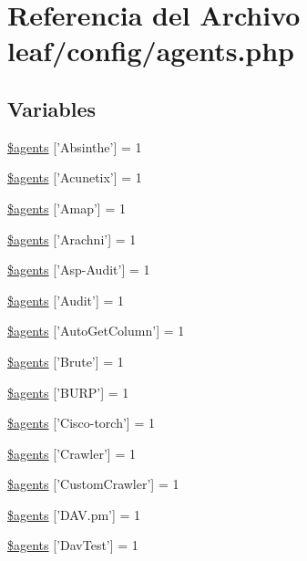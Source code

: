 \hypertarget{agents_8php}{\section{Referencia del Archivo leaf/config/agents.php}
\label{agents_8php}
}
\subsection*{Variables}
\begin{DoxyCompactItemize}
\item 
\hyperlink{agents_8php_a26354307c4e8f742e9a1835503de3a49}{\$agents} \mbox{[}'Absinthe'\mbox{]} = 1
\item 
\hyperlink{agents_8php_abbdedf5e446a9a99c06c8b32e8caf46e}{\$agents} \mbox{[}'Acunetix'\mbox{]} = 1
\item 
\hyperlink{agents_8php_a7e39730f201c353bf8ce0dff5b3088c1}{\$agents} \mbox{[}'Amap'\mbox{]} = 1
\item 
\hyperlink{agents_8php_a95d2a72c0b69091b2720de811d435830}{\$agents} \mbox{[}'Arachni'\mbox{]} = 1
\item 
\hyperlink{agents_8php_ae96e0481dc7a1032823b270a66e50721}{\$agents} \mbox{[}'Asp-\/Audit'\mbox{]} = 1
\item 
\hyperlink{agents_8php_a9edcf392a68dec4bf0cdc496cc3d6de9}{\$agents} \mbox{[}'Audit'\mbox{]} = 1
\item 
\hyperlink{agents_8php_ade22bffe2d979ef9c8070dcfd0595523}{\$agents} \mbox{[}'Auto\-Get\-Column'\mbox{]} = 1
\item 
\hyperlink{agents_8php_ae2900c7672753a2b91ea0ebe928f34d8}{\$agents} \mbox{[}'Brute'\mbox{]} = 1
\item 
\hyperlink{agents_8php_a9712cdf0164e983f6ef4f444606de781}{\$agents} \mbox{[}'B\-U\-R\-P'\mbox{]} = 1
\item 
\hyperlink{agents_8php_ab72b611bef7a9467d61552378946db2e}{\$agents} \mbox{[}'Cisco-\/torch'\mbox{]} = 1
\item 
\hyperlink{agents_8php_a85ac9db2537a73d053c3c22374fe7d57}{\$agents} \mbox{[}'Crawler'\mbox{]} = 1
\item 
\hyperlink{agents_8php_a50d6c7990c1746629329c7deff0fa8cc}{\$agents} \mbox{[}'Custom\-Crawler'\mbox{]} = 1
\item 
\hyperlink{agents_8php_a51eb23f65a8cb7571c54a139414d0a04}{\$agents} \mbox{[}'D\-A\-V.\-pm'\mbox{]} = 1
\item 
\hyperlink{agents_8php_a895d84bac6af0cef0413fe75230cd8c9}{\$agents} \mbox{[}'Dav\-Test'\mbox{]} = 1

\end{DoxyCompactItemize}
